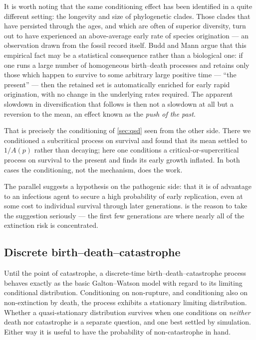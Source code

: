 It is worth noting that the same conditioning effect has been identified in a quite
different setting: the longevity and size of phylogenetic clades. Those clades that
have persisted through the ages, and which are often of superior diversity, turn out
to have experienced an above-average early rate of species origination --- an
observation drawn from the fossil record itself. Budd and Mann \cite{Budd2018} argue
that this empirical fact may be a statistical consequence rather than a biological
one: if one runs a large number of homogeneous birth--death processes and retains
only those which happen to survive to some arbitrary large positive time --- ``the
present'' --- then the retained set is automatically enriched for early rapid
origination, with no change in the underlying rates required. The apparent slowdown
in diversification that follows is then not a slowdown at all but a reversion to the
mean, an effect known as the \emph{push of the past}.

That is precisely the conditioning of \cref{sec:qsd} seen from the other side. There
we conditioned a subcritical process on survival and found that its mean settled to
$1/A(p)$ rather than decaying; here one conditions a critical-or-supercritical
process on survival to the present and finds its early growth inflated. In both
cases the conditioning, not the mechanism, does the work.

The parallel suggests a hypothesis on the pathogenic side: that it is of advantage to
an infectious agent to secure a high probability of early replication, even at some
cost to individual survival through later generations.  is the
reason to take the suggestion seriously --- the first few generations are where
nearly all of the extinction risk is concentrated.

\subsection{Discrete birth--death--catastrophe}
\label{sec:bdc}

Until the point of catastrophe, a discrete-time birth--death--catastrophe process
behaves exactly as the basic Galton--Watson model with regard to its limiting
conditional distribution. Conditioning on non-rupture, and conditioning also on
non-extinction by death, the process exhibits a stationary limiting distribution.
Whether a quasi-stationary distribution survives when one conditions on
\emph{neither} death nor catastrophe is a separate question, and one best settled by
simulation. Either way it is useful to have the probability of non-catastrophe in
hand.

